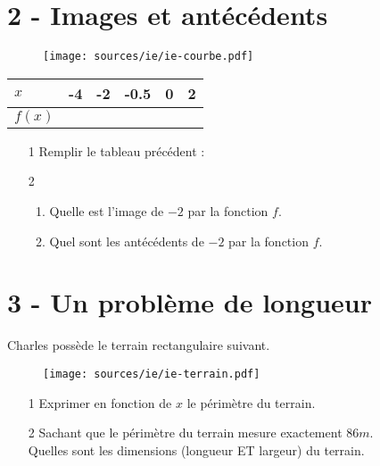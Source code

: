 \documentclass[11pt]{article}
\begin{document}
\noindent\hrulefill

\section*{2 - Images et antécédents}

\begin{multicols}{2}

  \begin{figure}[H]
    \centering
    \texttt{[image: sources/ie/ie-courbe.pdf]}
  \end{figure}

  \begin{center}
    \begin{tabular}{| l || c | c | c | c | c |}
      \hline			
      $x$    & -4 & -2 & -0.5 & 0 & 2\\
      \hline  
      $f(x)$ &    &    &      &   & \\
      \hline  
    \end{tabular}
  \end{center}


  \begin{enumerate}
  \item[1] Remplir le tableau précédent :
  \item[2] 
    \begin{enumerate}
    \item Quelle est l'image de $-2$ par la fonction $f$.
    \item Quel sont les antécédents de $-2$ par la fonction $f$.
    \end{enumerate}
  \end{enumerate}

\end{multicols}

\noindent\hrulefill

\section*{3 - Un problème de longueur }

\begin{multicols}{2}

  Charles possède le terrain rectangulaire suivant. 

  \begin{figure}[H]
    \centering
    \texttt{[image: sources/ie/ie-terrain.pdf]}
  \end{figure}
 
  \begin{enumerate}
  \item[1] Exprimer en fonction de $x$ le périmètre du terrain.
  \item[2]   Sachant que le périmètre du terrain mesure exactement $86m$.\\
  Quelles sont les dimensions (longueur ET largeur) du terrain.
  \end{enumerate}

\end{multicols}
\end{document}
